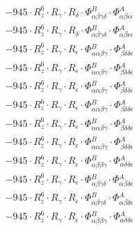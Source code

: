 \documentclass{article}
\begin{document}
\begin{subequations}
\begin{gather}
\begin{array}{c}
 \\[0.2em] 		 - 945 \cdot R_{z}^{6} \cdot R_{\gamma{}} \cdot R_{\delta{}} \cdot \Phi{}^{B}_{\alpha{}\beta{}\gamma{}\delta{}} \cdot \Phi{}^{A}_{\alpha{}\beta{}\epsilon{}\epsilon{}} 
 \\[0.2em] 		 - 945 \cdot R_{z}^{6} \cdot R_{\gamma{}} \cdot R_{\delta{}} \cdot \Phi{}^{B}_{\alpha{}\beta{}\gamma{}\delta{}} \cdot \Phi{}^{A}_{\alpha{}\beta{}\epsilon{}\epsilon{}} 
 \\[0.2em] 		 - 945 \cdot R_{z}^{6} \cdot R_{\gamma{}} \cdot R_{\epsilon{}} \cdot \Phi{}^{B}_{\alpha{}\alpha{}\beta{}\gamma{}} \cdot \Phi{}^{A}_{\beta{}\delta{}\delta{}\epsilon{}} 
 \\[0.2em] 		 - 945 \cdot R_{z}^{6} \cdot R_{\gamma{}} \cdot R_{\epsilon{}} \cdot \Phi{}^{B}_{\alpha{}\alpha{}\beta{}\gamma{}} \cdot \Phi{}^{A}_{\beta{}\delta{}\delta{}\epsilon{}} 
 \\[0.2em] 		 - 945 \cdot R_{z}^{6} \cdot R_{\gamma{}} \cdot R_{\epsilon{}} \cdot \Phi{}^{B}_{\alpha{}\alpha{}\beta{}\gamma{}} \cdot \Phi{}^{A}_{\beta{}\delta{}\delta{}\epsilon{}} 
 \\[0.2em] 		 - 945 \cdot R_{z}^{6} \cdot R_{\gamma{}} \cdot R_{\epsilon{}} \cdot \Phi{}^{B}_{\alpha{}\alpha{}\beta{}\gamma{}} \cdot \Phi{}^{A}_{\beta{}\delta{}\delta{}\epsilon{}} 
 \\[0.2em] 		 - 945 \cdot R_{z}^{6} \cdot R_{\gamma{}} \cdot R_{\epsilon{}} \cdot \Phi{}^{B}_{\alpha{}\alpha{}\beta{}\gamma{}} \cdot \Phi{}^{A}_{\beta{}\delta{}\delta{}\epsilon{}} 
 \\[0.2em] 		 - 945 \cdot R_{z}^{6} \cdot R_{\gamma{}} \cdot R_{\epsilon{}} \cdot \Phi{}^{B}_{\alpha{}\alpha{}\beta{}\gamma{}} \cdot \Phi{}^{A}_{\beta{}\delta{}\delta{}\epsilon{}} 
 \\[0.2em] 		 - 945 \cdot R_{z}^{6} \cdot R_{\gamma{}} \cdot R_{\epsilon{}} \cdot \Phi{}^{B}_{\alpha{}\beta{}\beta{}\gamma{}} \cdot \Phi{}^{A}_{\alpha{}\delta{}\delta{}\epsilon{}} 
 \\[0.2em] 		 - 945 \cdot R_{z}^{6} \cdot R_{\gamma{}} \cdot R_{\epsilon{}} \cdot \Phi{}^{B}_{\alpha{}\beta{}\gamma{}\delta{}} \cdot \Phi{}^{A}_{\alpha{}\beta{}\delta{}\epsilon{}} 
 \\[0.2em] 		 - 945 \cdot R_{z}^{6} \cdot R_{\gamma{}} \cdot R_{\epsilon{}} \cdot \Phi{}^{B}_{\alpha{}\beta{}\gamma{}\delta{}} \cdot \Phi{}^{A}_{\alpha{}\beta{}\delta{}\epsilon{}} 
 \\[0.2em] 		 - 945 \cdot R_{z}^{6} \cdot R_{\gamma{}} \cdot R_{\epsilon{}} \cdot \Phi{}^{B}_{\alpha{}\beta{}\beta{}\gamma{}} \cdot \Phi{}^{A}_{\alpha{}\delta{}\delta{}\epsilon{}} 

\end{array}
\end{gather}
\end{subequations}
\end{document}
